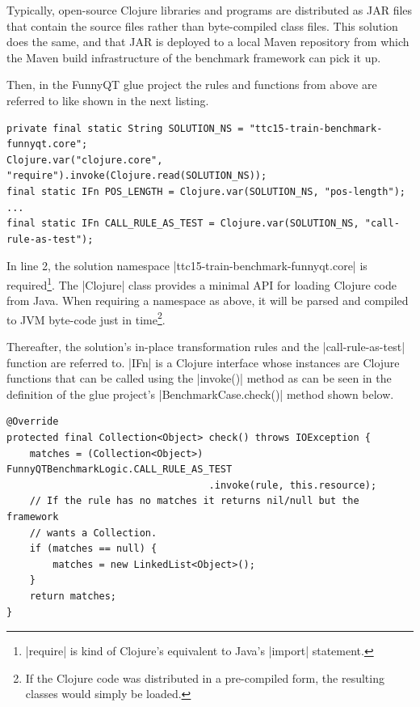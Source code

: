 \documentclass[submission]{eptcs}
\newcommand{\code}{\clojureinline}
\begin{document}
Typically, open-source Clojure libraries and programs are distributed as JAR
files that contain the source files rather than byte-compiled class files.
This solution does the same, and that JAR is deployed to a local Maven
repository from which the Maven build infrastructure of the benchmark framework
can pick it up.

Then, in the FunnyQT glue project the rules and functions from above are
referred to like shown in the next listing.

\begin{verbatim}
private final static String SOLUTION_NS = "ttc15-train-benchmark-funnyqt.core";
Clojure.var("clojure.core", "require").invoke(Clojure.read(SOLUTION_NS));
final static IFn POS_LENGTH = Clojure.var(SOLUTION_NS, "pos-length");
...
final static IFn CALL_RULE_AS_TEST = Clojure.var(SOLUTION_NS, "call-rule-as-test");
\end{verbatim}

In line 2, the solution namespace \code|ttc15-train-benchmark-funnyqt.core| is
required\footnote{\code|require| is kind of Clojure's equivalent to Java's
  \code|import| statement.}.  The \code|Clojure| class provides a minimal API
for loading Clojure code from Java.  When requiring a namespace as above, it
will be parsed and compiled to JVM byte-code just in time\footnote{If the
  Clojure code was distributed in a pre-compiled form, the resulting classes
  would simply be loaded.}.

Thereafter, the solution's in-place transformation rules and the
\code|call-rule-as-test| function are referred to.  \code|IFn| is a Clojure
interface whose instances are Clojure functions that can be called using the
\code|invoke()| method as can be seen in the definition of the glue project's
\code|BenchmarkCase.check()| method shown below.

\begin{verbatim}
@Override
protected final Collection<Object> check() throws IOException {
    matches = (Collection<Object>) FunnyQTBenchmarkLogic.CALL_RULE_AS_TEST
                                   .invoke(rule, this.resource);
    // If the rule has no matches it returns nil/null but the framework
    // wants a Collection.
    if (matches == null) {
        matches = new LinkedList<Object>();
    }
    return matches;
}
\end{verbatim}
\end{document}
